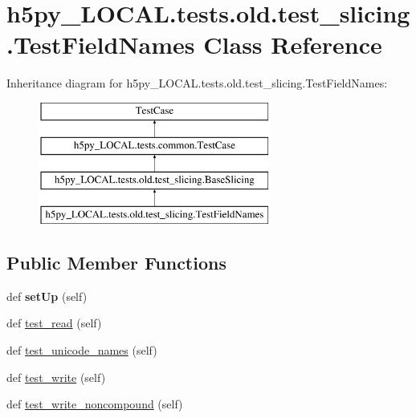 \hypertarget{classh5py__LOCAL_1_1tests_1_1old_1_1test__slicing_1_1TestFieldNames}{}\section{h5py\+\_\+\+L\+O\+C\+A\+L.\+tests.\+old.\+test\+\_\+slicing.\+Test\+Field\+Names Class Reference}
\label{classh5py__LOCAL_1_1tests_1_1old_1_1test__slicing_1_1TestFieldNames}
Inheritance diagram for h5py\+\_\+\+L\+O\+C\+A\+L.\+tests.\+old.\+test\+\_\+slicing.\+Test\+Field\+Names\+:\begin{figure}[H]
\begin{center}
\leavevmode
\includegraphics[height=4.000000cm]{classh5py__LOCAL_1_1tests_1_1old_1_1test__slicing_1_1TestFieldNames}
\end{center}
\end{figure}
\subsection*{Public Member Functions}
\begin{DoxyCompactItemize}
\item 
\mbox{\label{classh5py__LOCAL_1_1tests_1_1old_1_1test__slicing_1_1TestFieldNames_a81ccb86dee5be5ef948e79aecde46afa}} 
def {\bfseries set\+Up} (self)
\item 
def \hyperlink{classh5py__LOCAL_1_1tests_1_1old_1_1test__slicing_1_1TestFieldNames_aba57171a26a29f99b9dc7c67dea49774}{test\+\_\+read} (self)
\item 
def \hyperlink{classh5py__LOCAL_1_1tests_1_1old_1_1test__slicing_1_1TestFieldNames_a83684a87c8d0f042faab77b0784ba9e2}{test\+\_\+unicode\+\_\+names} (self)
\item 
def \hyperlink{classh5py__LOCAL_1_1tests_1_1old_1_1test__slicing_1_1TestFieldNames_a5fbfabf9d54cd6445d9ca28015409b10}{test\+\_\+write} (self)
\item 
def \hyperlink{classh5py__LOCAL_1_1tests_1_1old_1_1test__slicing_1_1TestFieldNames_a717b4f180bd8e379423702cd05dbfa4e}{test\+\_\+write\+\_\+noncompound} (self)
\end{DoxyCompactItemize}
